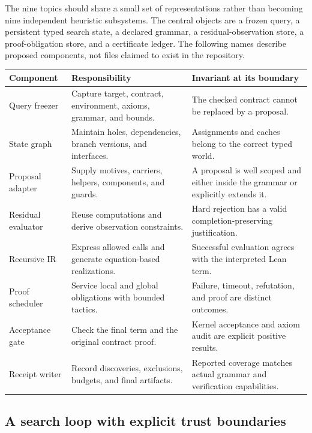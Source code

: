 \documentclass[11pt,a4paper]{article}
\theoremstyle{remark}
\begin{document}
The nine topics should share a small set of representations rather than becoming nine independent heuristic subsystems. The central objects are a frozen query, a persistent typed search state, a declared grammar, a residual-observation store, a proof-obligation store, and a certificate ledger. The following names describe proposed components, not files claimed to exist in the repository.

\begin{longtable}{@{}P{30mm}P{61mm}P{60mm}@{}}
\toprule
Component & Responsibility & Invariant at its boundary\\
\midrule
\endhead
Query freezer & Capture target, contract, environment, axioms, grammar, and bounds. & The checked contract cannot be replaced by a proposal.\\
State graph & Maintain holes, dependencies, branch versions, and interfaces. & Assignments and caches belong to the correct typed world.\\
Proposal adapter & Supply motives, carriers, helpers, components, and guards. & A proposal is well scoped and either inside the grammar or explicitly extends it.\\
Residual evaluator & Reuse computations and derive observation constraints. & Hard rejection has a valid completion-preserving justification.\\
Recursive IR & Express allowed calls and generate equation-based realizations. & Successful evaluation agrees with the interpreted Lean term.\\
Proof scheduler & Service local and global obligations with bounded tactics. & Failure, timeout, refutation, and proof are distinct outcomes.\\
Acceptance gate & Check the final term and the original contract proof. & Kernel acceptance and axiom audit are explicit positive results.\\
Receipt writer & Record discoveries, exclusions, budgets, and final artifacts. & Reported coverage matches actual grammar and verification capabilities.\\
\bottomrule
\end{longtable}

\subsection{A search loop with explicit trust boundaries}
\end{document}
